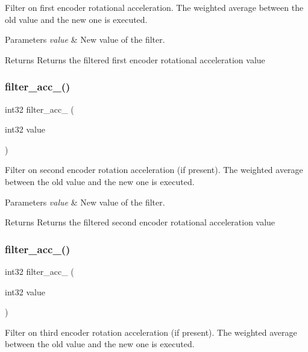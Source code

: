 Filter on first encoder rotational acceleration. The weighted average between the old value and the new one is executed.


\begin{DoxyParams}{Parameters}
{\em value} & New value of the filter.\\
\hline
\end{DoxyParams}
\begin{DoxyReturn}{Returns}
Returns the filtered first encoder rotational acceleration value 
\end{DoxyReturn}
\mbox{\label{utils_8c_a8578af55dde4ea39bb3525b417ff82e2}} 
\subsubsection{filter\+\_\+acc\+\_()}
{\footnotesize\ttfamily int32 filter\+\_\+acc\+\_ (\begin{DoxyParamCaption}\item[{int32}]{value }\end{DoxyParamCaption})}

Filter on second encoder rotation acceleration (if present). The weighted average between the old value and the new one is executed.


\begin{DoxyParams}{Parameters}
{\em value} & New value of the filter.\\
\hline
\end{DoxyParams}
\begin{DoxyReturn}{Returns}
Returns the filtered second encoder rotational acceleration value 
\end{DoxyReturn}
\mbox{\label{utils_8c_afbd3d0d191893b101de61bea2b04d7f2}} 
\subsubsection{filter\+\_\+acc\+\_()}
{\footnotesize\ttfamily int32 filter\+\_\+acc\+\_ (\begin{DoxyParamCaption}\item[{int32}]{value }\end{DoxyParamCaption})}

Filter on third encoder rotation acceleration (if present). The weighted average between the old value and the new one is executed.


